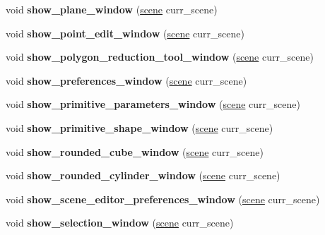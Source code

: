 \begin{DoxyCompactItemize}
void {\bfseries show\+\_\+plane\+\_\+window} (\hyperlink{classscene}{scene} curr\+\_\+scene)
\item 
\mbox{\label{classts__gui_a77ba6da521ff6f6fe1aa02f9f47cb33a}} 
void {\bfseries show\+\_\+point\+\_\+edit\+\_\+window} (\hyperlink{classscene}{scene} curr\+\_\+scene)
\item 
\mbox{\label{classts__gui_ae0d23b238b5367fbb2a632c6ee89bcd0}} 
void {\bfseries show\+\_\+polygon\+\_\+reduction\+\_\+tool\+\_\+window} (\hyperlink{classscene}{scene} curr\+\_\+scene)
\item 
\mbox{\label{classts__gui_a8148c07c566a90724db3881225ef3c8e}} 
void {\bfseries show\+\_\+preferences\+\_\+window} (\hyperlink{classscene}{scene} curr\+\_\+scene)
\item 
\mbox{\label{classts__gui_a7f8578f74c691af7eb4119d33392b60c}} 
void {\bfseries show\+\_\+primitive\+\_\+parameters\+\_\+window} (\hyperlink{classscene}{scene} curr\+\_\+scene)
\item 
\mbox{\label{classts__gui_a9213bf0ae8330770cdd45b47ca40ae0c}} 
void {\bfseries show\+\_\+primitive\+\_\+shape\+\_\+window} (\hyperlink{classscene}{scene} curr\+\_\+scene)
\item 
\mbox{\label{classts__gui_a45e6ae0eaeff2eacd71af8eaf09c108a}} 
void {\bfseries show\+\_\+rounded\+\_\+cube\+\_\+window} (\hyperlink{classscene}{scene} curr\+\_\+scene)
\item 
\mbox{\label{classts__gui_aeb3ad1e64165ee3b79255334ada7ed59}} 
void {\bfseries show\+\_\+rounded\+\_\+cylinder\+\_\+window} (\hyperlink{classscene}{scene} curr\+\_\+scene)
\item 
\mbox{\label{classts__gui_a9ec7c044945bbfa038efdada848dd9d8}} 
void {\bfseries show\+\_\+scene\+\_\+editor\+\_\+preferences\+\_\+window} (\hyperlink{classscene}{scene} curr\+\_\+scene)
\item 
\mbox{\label{classts__gui_ac655f074a8bf8954fbe4b38fd0de42a2}} 
void {\bfseries show\+\_\+selection\+\_\+window} (\hyperlink{classscene}{scene} curr\+\_\+scene)
\item 

\end{DoxyCompactItemize}
